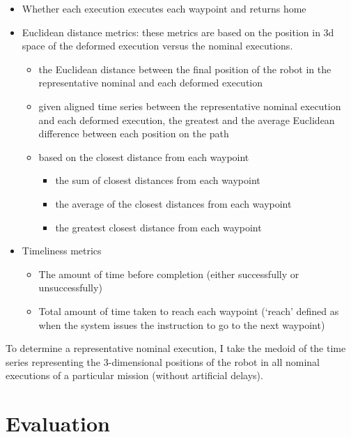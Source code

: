 \documentclass[conference]{IEEEtran}
\begin{document}
\begin{itemize}

\item Whether each execution executes each waypoint and returns home
\item Euclidean distance metrics: these metrics are based on the position in 3d space of the deformed execution versus the nominal executions.
\begin{itemize}

\item the Euclidean distance between the final position of the robot in the representative nominal and each deformed execution
\item given aligned time series between the representative nominal execution and each deformed execution, the greatest and the average Euclidean difference between each position on the path
\item based on the closest distance from each waypoint
\begin{itemize}

\item the sum of closest distances from each waypoint
\item the average of the closest distances from each waypoint
\item the greatest closest distance from each waypoint
\end{itemize}


\end{itemize}
\item Timeliness metrics
\begin{itemize}

\item The amount of time before completion (either successfully or unsuccessfully)
\item Total amount of time taken to reach each waypoint (`reach' defined as when the system issues the instruction to go to the next waypoint)
\end{itemize}

\end{itemize}


To determine a representative nominal execution, I take the medoid of the time series representing the 3-dimensional positions of the robot in all nominal executions of a particular mission (without artificial delays).

\section{Evaluation}
\end{document}
